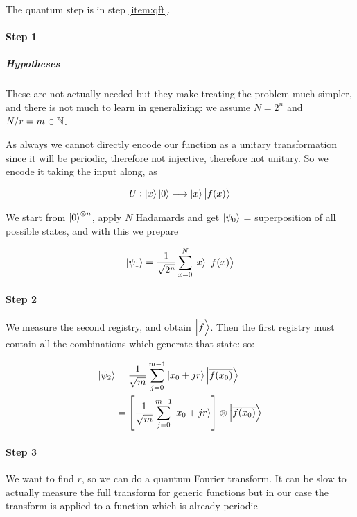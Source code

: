 \documentclass[main_montangero.tex]{subfiles}
\begin{document}
The quantum step is in step \ref{item:qft}.


\paragraph{Step 1}

\subparagraph{Hypotheses} These are not actually needed but they make treating the problem much simpler, and there is not much to learn in generalizing: we assume \( N = 2^n \) and \( N/r = m \in \mathbb{N} \).

As always we cannot directly encode our function as a unitary transformation since it will be periodic, therefore not injective, therefore not unitary. So we encode it taking the input along, as

\begin{equation}
   U: \ket{x}\ket{0} \longmapsto \ket{x} \ket{f(x)}
\end{equation}

We start from \( \ket{0}^{\otimes n} \), apply \(N\) Hadamards and get \( \ket{\psi_0} \) = superposition of all possible states, and with this
we prepare

\begin{equation}
  \ket{\psi_1} = \frac{1}{\sqrt{2^n}} \sum _{x=0} ^{N}   \ket{x} \ket{f(x)}
\end{equation}

\paragraph{Step 2}

We measure the second registry, and obtain \( \ket{\overline{f}} \). Then the first registry must contain all the combinations which generate that state: so:

\begin{subequations}
\begin{align}
  \ket{\psi_2}
  &= \frac{1}{\sqrt{m}}\sum _{j=0} ^{m-1} \ket{x_0 + jr} \ket{\overline{f(x_0)}}  \\
  &= \qty[\frac{1}{\sqrt{m}}\sum _{j=0} ^{m-1} \ket{x_0 + jr} ] \otimes \ket{\overline{f(x_0)}}
\end{align}
\end{subequations}

\paragraph{Step 3}

We want to find \( r \), so we can do a quantum Fourier transform. It can be slow  to actually measure the full transform for generic functions but in our case the transform is applied to a function which is already periodic
\end{document}
